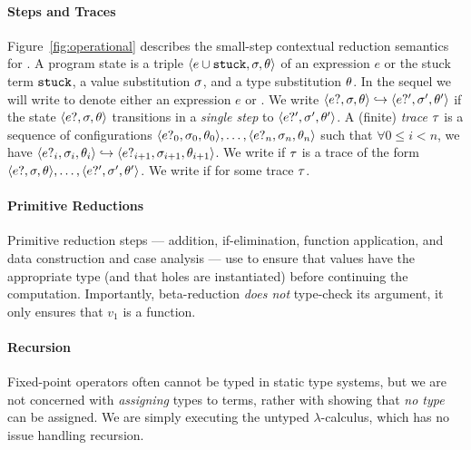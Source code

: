 \paragraph{Steps and Traces}

%
Figure~\ref{fig:operational} describes the small-step contextual
reduction semantics for \lang.
%
A program state is a triple $\langle e \cup \mathtt{stuck}, \sigma, \theta \rangle$ of an
expression $e$ or the stuck term $\mathtt{stuck}$, a value substitution $\sigma$,
and a type substitution $\theta$. In the sequel we will write \estuck to
denote either an expression $e$ or \stuck.
%
We write $\langle e?, \sigma, \theta \rangle \hookrightarrow \langle e?', \sigma', \theta' \rangle$ if the state
$\langle e?, \sigma, \theta \rangle$ transitions in a \emph{single step} to
$\langle e?', \sigma', \theta' \rangle$.
%
A (finite) \emph{trace} $\tau$ is a sequence of configurations
$\langle e?_0, \sigma_0, \theta_0 \rangle, \ldots, \langle e?_n, \sigma_n, \theta_n \rangle$ such that
$\forall 0 \leq i < n$, we have
$\langle e?_i, \sigma_i, \theta_i \rangle \hookrightarrow \langle e?_{i+1}, \sigma_{i+1}, \theta_{i+1} \rangle$.
%
We write  if $\tau$ is
a trace of the form $\langle e?, \sigma, \theta \rangle,\ldots,\langle e?', \sigma', \theta' \rangle$.
%
We write  if
 for some trace $\tau$.

\paragraph{Primitive Reductions}
Primitive reduction steps --- addition, if-elimination, function
application, and data construction and case analysis --- use \forcesym
to ensure that values have the appropriate type (and that holes are
instantiated) before continuing the computation. Importantly,
beta-reduction \emph{does not} type-check its argument, it only ensures
that $v_1$ is a function.

\paragraph{Recursion}
Fixed-point operators often cannot be typed in static type systems, but
we are not concerned with \emph{assigning} types to terms, rather with
showing that \emph{no type} can be assigned. We are simply executing the
untyped $\lambda$-calculus, which has no issue handling recursion.

